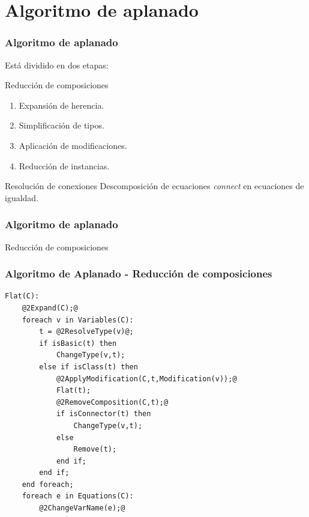 \section{Algoritmo de aplanado}

\begin{frame}[fragile]
\frametitle{Algoritmo de aplanado} 
Está dividido en dos etapas:
\begin{block}{Reducción de composiciones}
\begin{enumerate}
\item Expansión de herencia.
\item Simplificación de tipos.
\item Aplicación de modificaciones.
\item Reducción de instancias. 
\end{enumerate}
\end{block}

\begin{block}{Resolución de conexiones}
Descomposición de ecuaciones \textit{connect} en ecuaciones de igualdad.
\end{block}
\end{frame}

\begin{frame}[fragile]
\frametitle{Algoritmo de aplanado} 
\begin{center}
\huge Reducción de composiciones
\end{center}
\end{frame}

\begin{frame}[fragile]
\frametitle{Algoritmo de Aplanado - Reducción de composiciones} 
\begin{lstlisting}[style=base,basicstyle=\scriptsize]
Flat(C):
    @2Expand(C);@
    foreach v in Variables(C):
        t = @2ResolveType(v)@;
        if isBasic(t) then 
            ChangeType(v,t);
        else if isClass(t) then
            @2ApplyModification(C,t,Modification(v));@
            Flat(t);
            @2RemoveComposition(C,t);@  
            if isConnector(t) then
                ChangeType(v,t);
            else
                Remove(t);
            end if;     
        end if;     
    end foreach;    
    foreach e in Equations(C):  
        @2ChangeVarName(e);@     
\end{lstlisting}
\end{frame}

